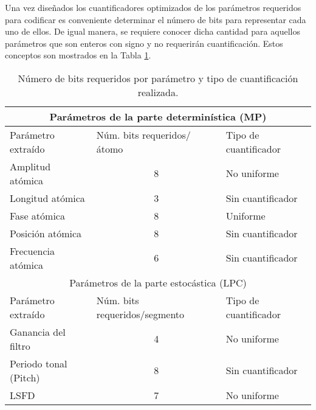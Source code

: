 Una vez diseñados los cuantificadores optimizados de los parámetros requeridos para codificar es conveniente determinar el número de bits para representar cada uno de ellos. De igual manera, se requiere conocer dicha cantidad para aquellos parámetros que son enteros con signo y no requerirán cuantificación. Estos conceptos son mostrados en la Tabla \ref{Nbits}.
\begin{table}[h]
\centering
\begin{tabular}{@{}lcl@{}}
\toprule
\multicolumn{3}{c}{Parámetros de la parte determinística (MP)}                           \\ \midrule
Parámetro extraído    & \multicolumn{1}{l}{Núm. bits requeridos/átomo} & Tipo de cuantificador \\ \midrule
Amplitud atómica      & 8                                        & No uniforme           \\ \midrule
Longitud atómica      & 3                                        & Sin cuantificador     \\ \midrule
Fase atómica          & 8                                        & Uniforme              \\ \midrule
Posición atómica      & 8                                        & Sin cuantificador     \\ \midrule
Frecuencia atómica    & 6                                        & Sin cuantificador     \\ \midrule
\multicolumn{3}{c}{Parámetros de la parte estocástica (LPC)}                            \\ \midrule
Parámetro extraído    & \multicolumn{1}{l}{Núm. bits requeridos/segmento} & Tipo de cuantificador \\ \midrule
Ganancia del filtro   & 4                                        & No uniforme           \\ \midrule
Periodo tonal (Pitch) & 8                                        & Sin cuantificador     \\ \midrule
LSFD                  & 7                                        & No uniforme          
\end{tabular}
	\caption{Número de bits requeridos por parámetro y tipo de cuantificación realizada.}
	\label{Nbits}
\end{table}


